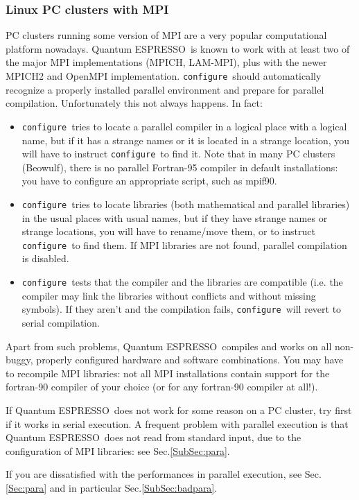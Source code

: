 \documentclass[12pt,a4paper]{article}
\def\qe{{\sc Quantum ESPRESSO}}
\def\configure{\texttt{configure}}
\begin{document}
\subsubsection{Linux PC clusters with MPI}
\label{SubSec:LinuxPCMPI}
PC clusters running some version of MPI are a very popular
computational platform nowadays. \qe\ is known to work
with at least two of the major MPI implementations (MPICH, LAM-MPI),
plus with the newer MPICH2 and OpenMPI implementation. 
\configure\ should automatically recognize a properly installed
parallel environment and prepare for parallel compilation. 
Unfortunately this not always happens. In fact:
\begin{itemize}
\item \configure\ tries to locate a parallel compiler in a logical
  place with a logical name,  but if it has a strange names or it is
  located  in a strange location, you will have to instruct \configure\ 
  to find it. Note that in many PC clusters (Beowulf), there is no
  parallel Fortran-95 compiler in default installations:  you have to
  configure an appropriate script, such as mpif90. 
\item \configure\ tries to locate libraries (both mathematical and
  parallel libraries) in the usual places with usual names, but if
  they have strange names or strange locations, you will have to
  rename/move them, or to instruct \configure\ to find them. If MPI
  libraries are not found,
  parallel compilation is disabled. 
\item \configure\ tests that the compiler and the libraries are
  compatible (i.e. the compiler may link the libraries without
  conflicts and without missing symbols). If they aren't and the
  compilation fails, \configure\ will revert to serial compilation. 
\end{itemize}

Apart from such problems, \qe\ compiles and works on all non-buggy, properly
configured hardware and software combinations. You may have to
recompile MPI libraries: not all MPI installations contain support for
the fortran-90 compiler of your choice (or for any fortran-90 compiler
at all!). 

If \qe\ does not work for some reason on a PC cluster,
try first if it works in serial execution. A frequent problem with parallel
execution is that \qe\ does not read from standard input,
due to the configuration of MPI libraries: see Sec.\ref{SubSec:para}.

If you are dissatisfied with the performances in parallel execution,
see Sec.\ref{Sec:para} and in particular Sec.\ref{SubSec:badpara}.
\end{document}
